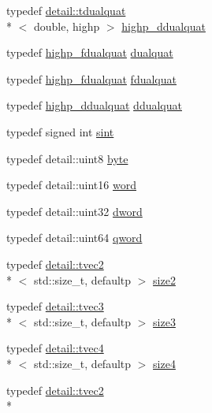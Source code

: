 \begin{DoxyCompactItemize}
typedef \hyperlink{structglm_1_1detail_1_1tdualquat}{detail\-::tdualquat}\\*
$<$ double, highp $>$ \hyperlink{group__gtc__dual__quaternion_ga61b654c21f080135aedcf23461eb1037}{highp\-\_\-ddualquat}
\item 
typedef \hyperlink{group__gtc__dual__quaternion_ga2ed3283c09d3ffaf52a0e0a4b248eab6}{highp\-\_\-fdualquat} \hyperlink{group__gtc__dual__quaternion_ga2f6227b5f9dc08a2e7682065a84b3aa9}{dualquat}
\item 
typedef \hyperlink{group__gtc__dual__quaternion_ga2ed3283c09d3ffaf52a0e0a4b248eab6}{highp\-\_\-fdualquat} \hyperlink{group__gtc__dual__quaternion_ga436906129bc69ca5059555cafcbac9fd}{fdualquat}
\item 
typedef \hyperlink{group__gtc__dual__quaternion_ga61b654c21f080135aedcf23461eb1037}{highp\-\_\-ddualquat} \hyperlink{group__gtc__dual__quaternion_ga373431ffdd82d5c03c258217a9e1f1a6}{ddualquat}
\item 
typedef signed int \hyperlink{group__gtx__integer_ga73643e09d8c6d362418aec541fdb987d}{sint}
\item 
typedef detail\-::uint8 \hyperlink{group__gtx__raw__data_gacd7fe1f2ad60a57f7d7ad4f1e6836efd}{byte}
\item 
typedef detail\-::uint16 \hyperlink{group__gtx__raw__data_ga5617a479d471021b5c773c5e969ba46d}{word}
\item 
typedef detail\-::uint32 \hyperlink{group__gtx__raw__data_ga1fc2589df6d44e923cd1820cf14805cf}{dword}
\item 
typedef detail\-::uint64 \hyperlink{group__gtx__raw__data_ga32447af289e879589883c9b7e3be1246}{qword}
\item 
typedef \hyperlink{structglm_1_1detail_1_1tvec2}{detail\-::tvec2}\\*
$<$ std\-::size\-\_\-t, defaultp $>$ \hyperlink{group__gtx__std__based__type_ga393e8beba20ea33452384087a2864f86}{size2}
\item 
typedef \hyperlink{structglm_1_1detail_1_1tvec3}{detail\-::tvec3}\\*
$<$ std\-::size\-\_\-t, defaultp $>$ \hyperlink{group__gtx__std__based__type_gae1dda4cdccd4c1abeeb2e470c048d0c9}{size3}
\item 
typedef \hyperlink{structglm_1_1detail_1_1tvec4}{detail\-::tvec4}\\*
$<$ std\-::size\-\_\-t, defaultp $>$ \hyperlink{group__gtx__std__based__type_gac04a40cfe44b5035770cf26d98a9349d}{size4}
\item 
typedef \hyperlink{structglm_1_1detail_1_1tvec2}{detail\-::tvec2}\\*

\end{DoxyCompactItemize}
